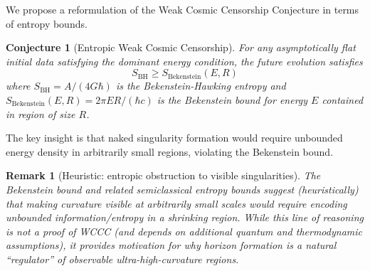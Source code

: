 \documentclass[12pt,a4paper]{article}
\newtheorem{conjecture}[theorem]{Conjecture}
\newtheorem{remark}[theorem]{Remark}
\begin{document}
We propose a reformulation of the Weak Cosmic Censorship Conjecture in terms of entropy bounds.

\begin{conjecture}[Entropic Weak Cosmic Censorship]
For any asymptotically flat initial data satisfying the dominant energy condition, the future evolution satisfies
\begin{equation}
S_{\text{BH}} \geq S_{\text{Bekenstein}}(E, R)
\end{equation}
where $S_{\text{BH}} = A/(4G\hbar)$ is the Bekenstein-Hawking entropy and $S_{\text{Bekenstein}}(E, R) = 2\pi ER/(\hbar c)$ is the Bekenstein bound for energy $E$ contained in region of size $R$.
\end{conjecture}

The key insight is that naked singularity formation would require unbounded energy density in arbitrarily small regions, violating the Bekenstein bound.

\begin{remark}[Heuristic: entropic obstruction to visible singularities]
The Bekenstein bound and related semiclassical entropy bounds suggest (heuristically) that making curvature visible at arbitrarily small scales would require encoding unbounded information/entropy in a shrinking region. While this line of reasoning is not a proof of WCCC (and depends on additional quantum and thermodynamic assumptions), it provides motivation for why horizon formation is a natural ``regulator'' of observable ultra-high-curvature regions.
\end{remark}
\end{document}
